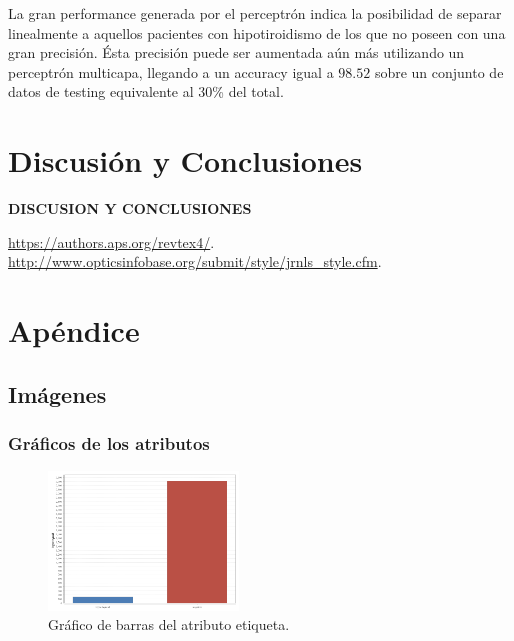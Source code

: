 \documentclass[osajnl,twocolumn,showpacs,superscriptaddress,10pt,floatfix]{revtex4-1} %
\begin{document}
La gran performance generada por el perceptrón indica la posibilidad de separar linealmente a aquellos pacientes con hipotiroidismo de los que no poseen con una gran precisión. Ésta precisión puede ser aumentada aún más utilizando un perceptrón multicapa, llegando a un accuracy igual a $98.52$ sobre un conjunto de datos de testing equivalente al 30\% del total.


\section{Discusión y Conclusiones}

\textbf{DISCUSION Y CONCLUSIONES}

\begin{thebibliography}{99}

 \url{https://authors.aps.org/revtex4/}.
 \url{http://www.opticsinfobase.org/submit/style/jrnls_style.cfm}.

\end{thebibliography}

\clearpage

\onecolumngrid

\section{Apéndice}

\subsection{Imágenes} \label{apendix:images}

\subsubsection{Gráficos de los atributos} \label{apendix:images:attr}

\twocolumngrid

\begin{figure}[H]
    \centering
    \includegraphics[width=0.45\textwidth]{analysis/bars_hypothyroid}
    \caption{Gráfico de barras del atributo etiqueta.}
    \label{figure:bars_hypothyroid}
\end{figure}
\end{document}
